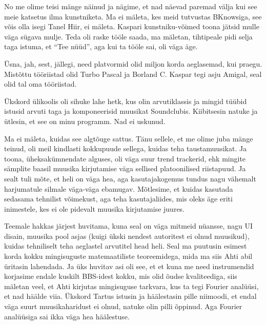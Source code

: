 No me olime teisi mänge näinud ja nägime, et nad näevad paremad välja kui see meie katsetus ilma kunstniketa. Ma ei mäleta, kes meid tutvustas BKnowsiga, see võis olla isegi Tanel Hiir, ei mäleta. Kaspari kunstniku-võimed toona jätsid mulle väga sügava mulje. Teda oli raske tööle saada, ma mäletan, tihtipeale pidi selja taga istuma, et \enquote{Tee nüüd}, aga kui ta tööle sai, oli väga äge. 


Üsna, jah, sest, jällegi, need platvormid olid miljon korda aeglasemad, kui praegu. Mistõttu tööriistad olid Turbo Pascal ja Borland C. Kaspar tegi asju Amigal, seal olid tal oma tööriistad.


Ükskord ülikoolis oli sihuke lahe hetk, kus olin arvutiklassis ja mingid tüübid istusid arvuti taga ja komponeerisid muusikat Soundclubis. Kiibitsesin natuke ja ütlesin, et see on minu programm. Nad ei uskunud. 

Ma ei mäleta, kuidas see algtõuge sattus.  Tänu sellele, et me olime juba mänge teinud, oli meil kindlasti kokkupuude sellega, kuidas teha taustamuusikat. Ja toona, üheksakümnendate alguses, oli väga suur trend trackerid, ehk mingite sämplite baasil muusika kirjutamise väga sellised platoonilised riistapuud. Ja sealt tuli mõte, et  heli on väga hea,  aga kasutajakogemus tundus nagu vähemalt harjumatule silmale väga-väga ebamugav. Mõtlesime, et kuidas kasutada sedasama tehnilist võimekust, aga teha  kasutajaliides, mis oleks äge eriti inimestele, kes ei ole pidevalt muusika kirjutamise juures.

Teemale hakkas järjest huvitama, kuna seal on väga mitmeid nüansse, nagu UI disain, muusika pool asjas (kuigi ükski nendest autoritest ei olnud muusikud), kuidas tehniliselt teha aeglastel arvutitel head heli. Seal ma puutusin esimest korda kokku mingisuguste matemaatiliste teoreemidega, mida ma siis Ahti abil üritasin lahendada. Ja üks huvitav asi oli see, et et kuna me need instrumendid korjasime endale kuskilt BBS-idest kokku, mis olid õudse kvaliteediga, siis mäletan veel, et Ahti kirjutas mingisuguse tarkvara, kus ta tegi Fourier analüüsi, et nad häälde viia. Ükskord Tartus istusin ja häälestasin pille niimoodi, et endal väga suurt muusikaharidust ei olnud, natuke olin pilli õppinud. Aga Fourier analüüsiga sai ikka väga hea häälestuse. 

